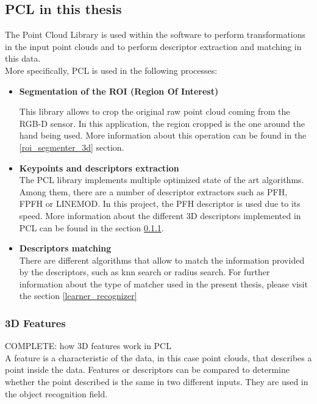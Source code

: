 \subsection{PCL in this thesis}
The Point Cloud Library is used within the software to perform transformations in the input point clouds and to perform descriptor extraction and matching in this data. 
\\

More specifically, PCL is used in the following processes: 

\begin{itemize}
	\item\textbf{Segmentation of the ROI (Region Of Interest)\\ }

	This library allows to crop the original raw point cloud coming from the RGB-D sensor. In this application, the region cropped is the one around the hand being used. More information about this operation can be found in the \ref{roi_segmenter_3d} section. 
	

	\item\textbf{ {Keypoints and descriptors extraction\\ }}
	 The PCL library implements multiple optimized state of the art algorithms. Among them, there are a number of descriptor extractors such as PFH, FPFH or LINEMOD. In this project, the PFH descriptor is used due to its speed. More information about the different 3D descriptors implemented in PCL can be found in the section \ref{3d_features}.


	\item \textbf{{Descriptors matching\\ }}
	There are different algorithms that allow to match the information provided by the descriptors, such as knn search or radius search. For further information about the type of matcher used in the present thesis, please visit the section \ref{learner_recognizer}
\end{itemize}


\subsubsection{3D Features}
\label{3d_features}
COMPLETE: how 3D features work in PCL 
\\

A feature is a characteristic of the data, in this case point clouds, that describes a point inside the data. Features or descriptors can be compared to determine whether the point described is the same in two different inputs. They are used in the object recognition field. 
\\

